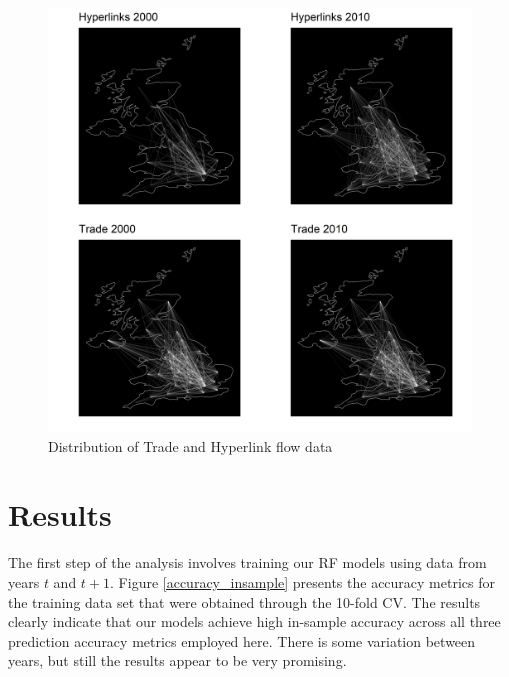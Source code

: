 \documentclass[]{interact}
\theoremstyle{plain}%
\theoremstyle{definition}
\theoremstyle{remark}
\begin{document}
\begin{figure}[p]
\includegraphics[width=1\linewidth]{figures/flow_maps} \caption{\label{Flow_maps}Distribution of Trade and Hyperlink flow data}\label{fig:unnamed-chunk-2}
\end{figure}

\hypertarget{sec:5}{%
\section{Results}\label{sec:5}}

The first step of the analysis involves training our RF models using
data from years \(t\) and \(t + 1\). Figure \ref{accuracy_insample}
presents the accuracy metrics for the training data set that were
obtained through the 10-fold CV. The results clearly indicate that our
models achieve high in-sample accuracy across all three prediction
accuracy metrics employed here. There is some variation between years,
but still the results appear to be very promising.
\end{document}
